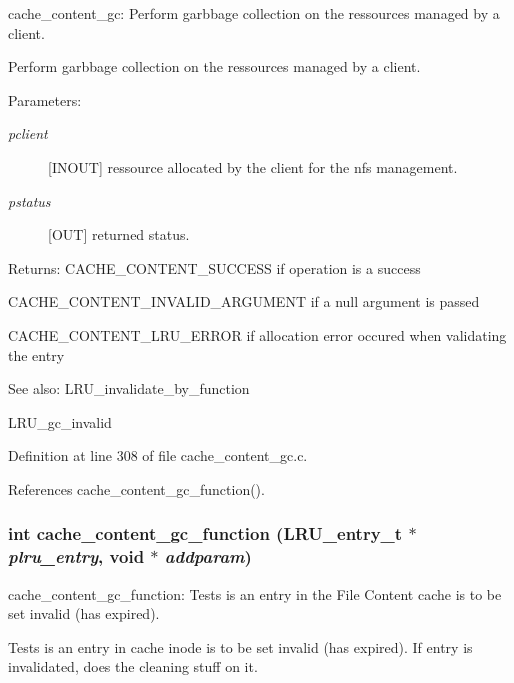 cache\_\-content\_\-gc: Perform garbbage collection on the ressources managed by a client.

Perform garbbage collection on the ressources managed by a client.

\begin{Desc}
\item[Parameters:]
\begin{description}
\item[{\em pclient}][INOUT] ressource allocated by the client for the nfs management. \item[{\em pstatus}][OUT] returned status.\end{description}
\end{Desc}
\begin{Desc}
\item[Returns:]CACHE\_\-CONTENT\_\-SUCCESS if operation is a success \par
 

CACHE\_\-CONTENT\_\-INVALID\_\-ARGUMENT if a null argument is passed \par
 

CACHE\_\-CONTENT\_\-LRU\_\-ERROR if allocation error occured when validating the entry\end{Desc}
\begin{Desc}
\item[See also:]LRU\_\-invalidate\_\-by\_\-function 

LRU\_\-gc\_\-invalid \end{Desc}


Definition at line 308 of file cache\_\-content\_\-gc.c.

References cache\_\-content\_\-gc\_\-function().
\subsubsection{\setlength{\rightskip}{0pt plus 5cm}int cache\_\-content\_\-gc\_\-function (LRU\_\-entry\_\-t $\ast$ {\em plru\_\-entry}, void $\ast$ {\em addparam})}\label{cache__content__gc_8c_a5}


cache\_\-content\_\-gc\_\-function: Tests is an entry in the File Content cache is to be set invalid (has expired).

Tests is an entry in cache inode is to be set invalid (has expired). If entry is invalidated, does the cleaning stuff on it.

